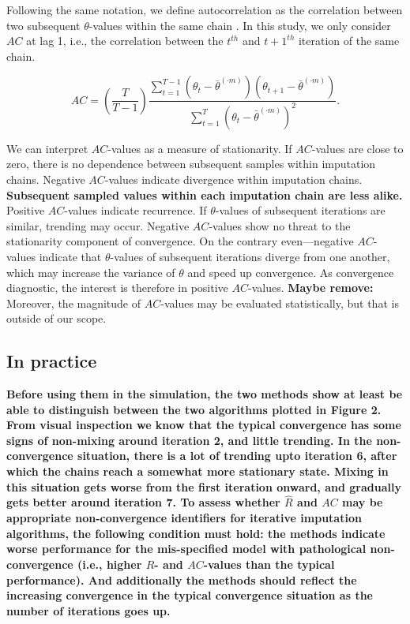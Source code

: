 \documentclass[Royal,times,sageh]{sagej}
\begin{document}
Following the same notation, we define autocorrelation as the
correlation between two subsequent \(\theta\)-values within the same
chain \citep[p.~147]{lync07}. In this study, we only consider \(AC\) at
lag 1, i.e., the correlation between the \(t^{th}\) and \(t+1^{th}\)
iteration of the same chain.

\begin{equation*}
AC = \left( \frac{T}{T-1} \right) \frac{\sum_{t=1}^{T-1}(\theta_t - \bar{\theta}^{(\cdot m)})(\theta_{t+1} - \bar{\theta}^{(\cdot m)})}{\sum_{t=1}^{T}(\theta_t - \bar{\theta}^{(\cdot m)})^2}.
\end{equation*}

We can interpret \(AC\)-values as a measure of stationarity. If
\(AC\)-values are close to zero, there is no dependence between
subsequent samples within imputation chains. Negative \(AC\)-values
indicate divergence within imputation chains. \textbf{Subsequent sampled
values within each imputation chain are less alike.} Positive
\(AC\)-values indicate recurrence. If \(\theta\)-values of subsequent
iterations are similar, trending may occur. Negative \(AC\)-values show
no threat to the stationarity component of convergence. On the contrary
even---negative \(AC\)-values indicate that \(\theta\)-values of
subsequent iterations diverge from one another, which may increase the
variance of \(\theta\) and speed up convergence. As convergence
diagnostic, the interest is therefore in positive \(AC\)-values.
\textbf{Maybe remove:} Moreover, the magnitude of \(AC\)-values may be
evaluated statistically, but that is outside of our scope.

\hypertarget{in-practice}{%
\subsection{In practice}\label{in-practice}}

\textbf{Before using them in the simulation, the two methods show at
least be able to distinguish between the two algorithms plotted in
Figure 2. From visual inspection we know that the typical convergence
has some signs of non-mixing around iteration 2, and little trending. In
the non-convergence situation, there is a lot of trending upto iteration
6, after which the chains reach a somewhat more stationary state. Mixing
in this situation gets worse from the first iteration onward, and
gradually gets better around iteration 7. To assess whether
\(\widehat{R}\) and \(AC\) may be appropriate non-convergence
identifiers for iterative imputation algorithms, the following condition
must hold: the methods indicate worse performance for the mis-specified
model with pathological non-convergence (i.e., higher \(\widehat{R}\)-
and \(AC\)-values than the typical performance). And additionally the
methods should reflect the increasing convergence in the typical
convergence situation as the number of iterations goes up.}
\end{document}
